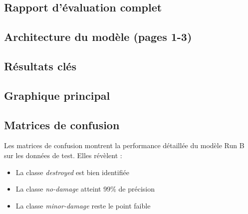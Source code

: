 % 
%


\subsection{Rapport d'évaluation complet}




\subsection{Architecture du modèle (pages 1-3)}




\subsection{Résultats clés}




\subsection{Graphique principal}




\subsection{Matrices de confusion}

Les matrices de confusion montrent la performance détaillée du modèle Run B
sur les données de test. Elles révèlent :
\begin{itemize}
    \item La classe \textit{destroyed} est bien identifiée
    \item La classe \textit{no-damage} atteint 99\% de précision
    \item La classe \textit{minor-damage} reste le point faible
\end{itemize}

